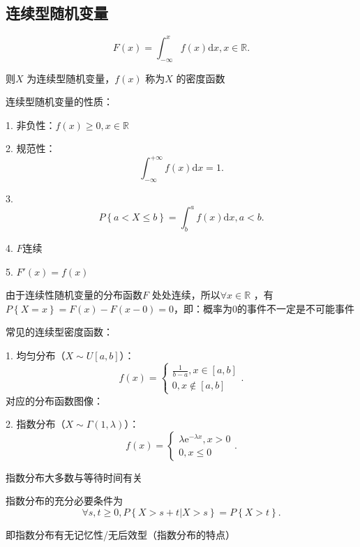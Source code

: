 \subsection{连续型随机变量}%
\label{sub:连续型随机变量}
\begin{defi}
    \[
        F\left( x \right) =\int_{-\infty}^{x} f\left( x \right) \text{d}x,x\in \mathbb{R}
    .\] 

    则$X$ 为连续型随机变量，$f\left( x \right) $ 称为$X$ 的密度函数
\end{defi}
连续型随机变量的性质：

1. 非负性：$f\left( x \right) \ge 0, x\in \mathbb{R}$

2. 规范性： \[
    \int_{-\infty}^{+\infty} f\left( x \right) \text{d}x =1
.\]

3. \[
    P\left\{ a<X\le b \right\} =\int_{b}^{a}f\left( x \right) \text{d}x, a<b
.\] 

4. $F$连续

5. $F'\left( x \right) =f\left( x \right) $

\begin{notation}
    由于连续性随机变量的分布函数$F$ 处处连续，所以$\forall x\in \mathbb{R}$ ，有$P\left\{ X=x \right\} =F\left( x \right) -F\left( x-0 \right) =0$，即：概率为0的事件不一定是不可能事件
\end{notation}
\begin{eg}
    
\end{eg}
常见的连续型密度函数：

1. 均匀分布（$X\sim U\left[ a,b \right] $）：\[
    f\left( x \right) =\begin{cases}
        \displaystyle{\frac{1}{b-a}},x\in \left[ a,b \right] \\
        0,x \not\in \left[ a,b \right] 
    \end{cases}
.\] 
对应的分布函数图像：
\begin{center}
\end{center}

2. 指数分布（$X\sim \Gamma\left( 1,\lambda \right) $）：\[
    f\left( x \right) =\begin{cases}
        \lambda\text{e}^{-\lambda x},x>0\\
        0,x\le 0
    \end{cases}
.\] 
\begin{notation}
    指数分布大多数与等待时间有关

    指数分布的充分必要条件为\[
        \forall s,t\ge 0,P\left\{ X>s+t|X>s \right\} =P\left\{ X>t \right\} 
    .\] 

    即指数分布有无记忆性/无后效型（指数分布的特点）
\end{notation}

